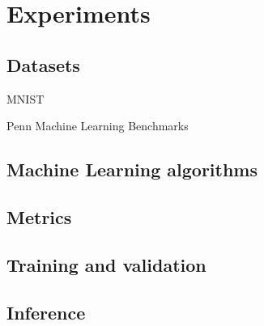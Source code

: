 \section{Experiments}
\label{sec:experiments}
\subsection{Datasets}
MNIST \parencite{dengMNISTDatabaseHandwritten2012}

Penn Machine Learning Benchmarks \parencite{olsonPMLBLargeBenchmark2017}




\subsection{Machine Learning algorithms}
\subsection{Metrics}
\subsection{Training and validation}
\subsection{Inference}

